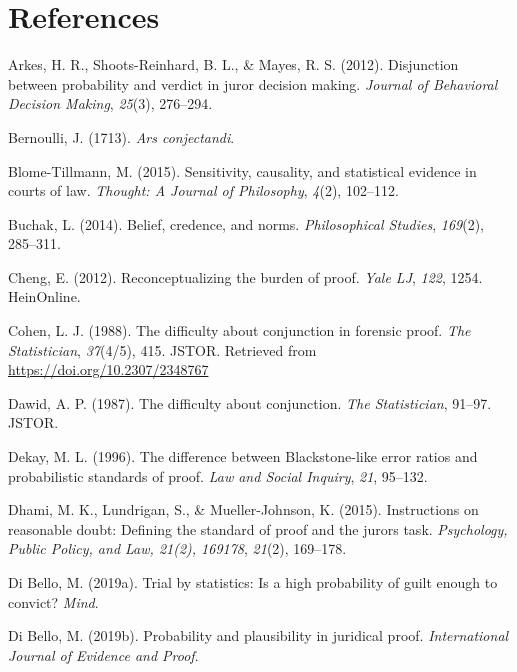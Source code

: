 \documentclass[10pt,dvipsnames,enabledeprecatedfontcommands]{scrartcl}
\begin{document}
\section{References}\label{references}

\hypertarget{refs}{}
\hypertarget{ref-arkesEtAl2012}{}
Arkes, H. R., Shoots-Reinhard, B. L., \& Mayes, R. S. (2012).
Disjunction between probability and verdict in juror decision making.
\emph{Journal of Behavioral Decision Making}, \emph{25}(3), 276--294.

\hypertarget{ref-Bernoulli1713Ars-conjectandi}{}
Bernoulli, J. (1713). \emph{Ars conjectandi}.

\hypertarget{ref-blome2015}{}
Blome-Tillmann, M. (2015). Sensitivity, causality, and statistical
evidence in courts of law. \emph{Thought: A Journal of Philosophy},
\emph{4}(2), 102--112.

\hypertarget{ref-buchak2014belief}{}
Buchak, L. (2014). Belief, credence, and norms. \emph{Philosophical
Studies}, \emph{169}(2), 285--311.

\hypertarget{ref-cheng2012reconceptualizing}{}
Cheng, E. (2012). Reconceptualizing the burden of proof. \emph{Yale LJ},
\emph{122}, 1254. HeinOnline.

\hypertarget{ref-cohen1988difficulty}{}
Cohen, L. J. (1988). The difficulty about conjunction in forensic proof.
\emph{The Statistician}, \emph{37}(4/5), 415. JSTOR. Retrieved from
\url{https://doi.org/10.2307/2348767}

\hypertarget{ref-dawid1987difficulty}{}
Dawid, A. P. (1987). The difficulty about conjunction. \emph{The
Statistician}, 91--97. JSTOR.

\hypertarget{ref-Dekay1996}{}
Dekay, M. L. (1996). The difference between Blackstone-like error ratios
and probabilistic standards of proof. \emph{Law and Social Inquiry},
\emph{21}, 95--132.

\hypertarget{ref-dhamiEtAl2015}{}
Dhami, M. K., Lundrigan, S., \& Mueller-Johnson, K. (2015). Instructions
on reasonable doubt: Defining the standard of proof and the jurors task.
\emph{Psychology, Public Policy, and Law, 21(2), 169178}, \emph{21}(2),
169--178.

\hypertarget{ref-diBello2019}{}
Di Bello, M. (2019a). Trial by statistics: Is a high probability of
guilt enough to convict? \emph{Mind}.

\hypertarget{ref-DiBello2019plausibility}{}
Di Bello, M. (2019b). Probability and plausibility in juridical proof.
\emph{International Journal of Evidence and Proof}.
\end{document}
